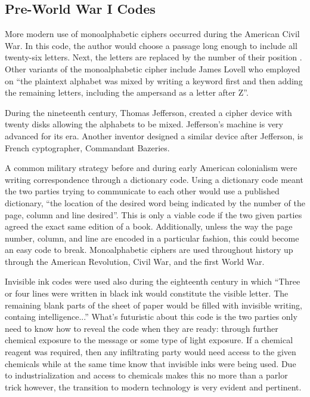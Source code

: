 \documentclass[12pt,letterpaper]{article} %
\begin{document}
\subsection{Pre-World War I Codes}	
More modern use of monoalphabetic ciphers occurred during the American Civil War.  In this code, the author would choose a passage long enough to include all twenty-six letters. Next, the letters are replaced by the number of their position \cite{Barker1}.  Other variants of the monoalphabetic cipher include James Lovell who employed on \enquote{the plaintext alphabet was mixed by writing a keyword first and then adding the remaining letters, including the ampersand as a letter after Z}\cite{Barker1}. \par  During the nineteenth century, Thomas Jefferson, created a cipher device with twenty disks allowing the alphabets to be mixed\cite{Barker1}. Jefferson's 
machine is very advanced for its era.  Another inventor designed a similar device after Jefferson, is French cyptographer, Commandant Bazeries.
\par A common military strategy before and during early American colonialism were writing correspondence through a dictionary code. Using a dictionary code meant the two parties trying to communicate to each other would use a published dictionary, \enquote{the location of the desired word being indicated by the number of the page, column and line desired}\cite{Barker1}.  This is only a viable code if the two given parties agreed the exact same edition of a book.  Additionally, unless the way the page number, column, and line are encoded in a particular fashion, this could become an easy code to break. Monoalphabetic ciphers are used throughout history up through the American Revolution, Civil War, and the first World War. \par
   Invisible ink codes were used also during the eighteenth century in which \enquote{Three or four lines were written in black ink would constitute the visible letter. The remaining blank parts of the sheet of paper would be filled 
with invisible writing, containg intelligence...}\cite{Barker1} What's futuristic about this code is the two parties only need to know how to reveal the code when they are ready: through further chemical exposure to the message or some type of light exposure.  If a chemical reagent was required, then any infiltrating party would need access to the given chemicals while at the same time know that invisible inks were being used.  Due to industrialization and access to chemicals makes this no more than a parlor trick however, the transition to modern technology is very evident and pertinent.
\end{document}
